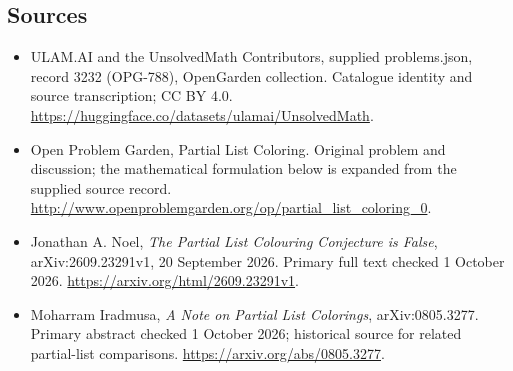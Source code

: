 \documentclass[11pt,a4paper]{article}
\begin{document}
\subsection{Sources}
\begin{itemize}
\item[S1] ULAM.AI and the UnsolvedMath Contributors, supplied problems.json, record 3232 (OPG-788), OpenGarden collection. Catalogue identity and source transcription; CC BY 4.0.
\url{https://huggingface.co/datasets/ulamai/UnsolvedMath}.
\item[S2] Open Problem Garden, Partial List Coloring. Original problem and discussion; the mathematical formulation below is expanded from the supplied source record.
\url{http://www.openproblemgarden.org/op/partial_list_coloring_0}.
\item[R1] Jonathan A. Noel, \emph{The Partial List Colouring
Conjecture is False}, arXiv:2609.23291v1, 20 September 2026.
Primary full text checked 1 October 2026.
\url{https://arxiv.org/html/2609.23291v1}.
\item[R2] Moharram Iradmusa, \emph{A Note on Partial List Colorings},
arXiv:0805.3277. Primary abstract checked 1 October 2026; historical
source for related partial-list comparisons.
\url{https://arxiv.org/abs/0805.3277}.
\end{itemize}
\end{document}
